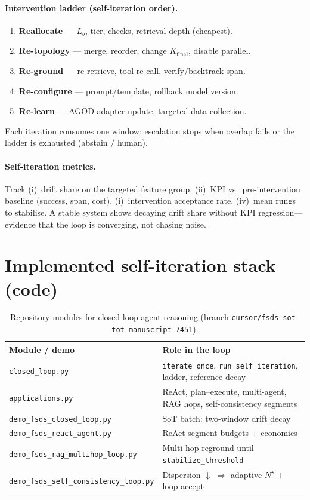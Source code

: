 \paragraph{Intervention ladder (self-iteration order).}
\begin{enumerate}[leftmargin=*]
  \item \textbf{Reallocate} --- $L_b$, tier, checks, retrieval depth (cheapest).
  \item \textbf{Re-topology} --- merge, reorder, change $K_{\mathrm{final}}$, disable parallel.
  \item \textbf{Re-ground} --- re-retrieve, tool re-call, verify/backtrack span.
  \item \textbf{Re-configure} --- prompt/template, rollback model version.
  \item \textbf{Re-learn} --- AGOD adapter update, targeted data collection.
\end{enumerate}
Each iteration consumes one window; escalation stops when overlap fails or the
ladder is exhausted (abstain / human).

\paragraph{Self-iteration metrics.} Track (i)~drift share on the targeted feature
group, (ii)~KPI vs.\ pre-intervention baseline (success, span, cost),
(i)~intervention acceptance rate, (iv)~mean rungs to stabilise. A stable system
shows decaying drift share without KPI regression---evidence that the loop is
converging, not chasing noise.

\section{Implemented self-iteration stack (code)}
\label{sec:impl-loop}

\begin{table}[t]
\centering
\small
\caption{Repository modules for closed-loop agent reasoning (branch
\texttt{cursor/fsds-sot-tot-manuscript-7451}).}
\label{tab:impl-loop}
\begin{tabular}{@{}ll@{}}
\toprule
Module / demo & Role in the loop \\
\midrule
\texttt{closed\_loop.py} &
\texttt{iterate\_once}, \texttt{run\_self\_iteration}, ladder, reference decay \\
\texttt{applications.py} &
ReAct, plan--execute, multi-agent, RAG hops, self-consistency segments \\
\texttt{demo\_fsds\_closed\_loop.py} & SoT batch: two-window drift decay \\
\texttt{demo\_fsds\_react\_agent.py} & ReAct segment budgets + economics \\
\texttt{demo\_fsds\_rag\_multihop\_loop.py} &
Multi-hop reground until \texttt{stabilize\_threshold} \\
\texttt{demo\_fsds\_self\_consistency\_loop.py} &
Dispersion $\downarrow$ $\Rightarrow$ adaptive $N^\star$ + loop accept \\
\bottomrule
\end{tabular}
\end{table}

